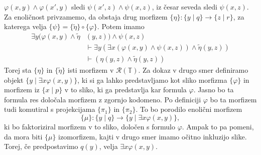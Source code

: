 \documentclass[../kategoricna_logika.tex]{subfiles}
\begin{document}
\begin{dokaz}
\begin{enumerate}[label=(\roman*)]
    $\varphi(x,y) \land \varphi(x',y)$ sledi
    $\psi(x',z) \land \psi(x,z)$, iz česar seveda sledi $\psi(x,z)$.
    Za enoličnost privzamemo, da obstaja drug morfizem
    $\{\eta\} : \{y \mid q\} \to \{z \mid r\}$, za katerega velja
    $\{\psi\} = \{\tilde{\eta}\} \circ \{\varphi\}$. Potem imamo
    \begin{align*}
      \exists y (\varphi(x,y) \land \tilde{\eta}&(y,z)) \land \psi(x,z) \\
                                                &\vdash \exists y (\exists x(\varphi(x,y) \land \psi(x,z)) \land \tilde{\eta}(y,z)) \\
                                                &\vdash (\eta(y,z) \land \tilde{\eta}(y,z))
    \end{align*}
    Torej sta $\{\eta\}$ in $\{\tilde{\eta}\}$ isti morfizem v
    $\mathcal{R}(\mathbb{T})$. Za dokaz v drugo smer definiramo objekt
    $\{ y \mid \exists x \varphi(x,y)\}$, ki si ga lahko predstavljamo
    kot sliko morfizma $\{\varphi\}$ in morfizem iz $\{x \mid p\}$ v
    to sliko, ki ga predstavlja kar formula $\varphi$. Jasno bo ta
    formula res določala morfizem z zgornjo kodomeno. Po definiciji
    $\varphi$ bo ta morfizem tudi komutiral s projekcijama $\{\pi_1\}$
    in $\{\pi_2\}$. To bo porodilo enolični morfizem
    \[\{\mu\} : \{y \mid q\} \to \{ y \mid \exists x \varphi(x,y)\},\]
    ki bo faktoriziral morfizem v to sliko, določen s formulo
    $\varphi$. Ampak to pa pomeni, da mora biti $\{\mu\}$ izomorfizem,
    kajti v drugo smer imamo očitno inkluzijo slike. Torej, če
    predpostavimo $q(y)$, velja $\exists x \varphi(x,y)$.



\end{enumerate}
\end{dokaz}
\end{document}

